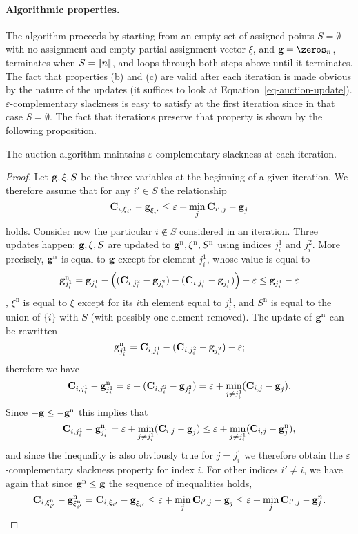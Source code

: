 \paragraph{Algorithmic properties.} The algorithm proceeds by starting from an empty set of assigned points $S=\emptyset$ with no assignment and empty partial assignment vector $\xi$, and $\gD=\zeros_n$, terminates when $S=\llbracket n\rrbracket$, and loops through both steps above until it terminates. The fact that properties {(b)} and {(c)} are valid after each iteration is made obvious by the nature of the updates (it suffices to look at Equation~\eqref{eq-auction-update}). $\varepsilon$-complementary slackness is easy to satisfy at the first iteration since in that case $S=\emptyset$. The fact that iterations preserve that property is shown by the following proposition.
\begin{prop} The auction algorithm maintains $\varepsilon$-complementary slackness at each iteration. 
\end{prop}
\begin{proof} 
	Let $\mathrm{\textbf{g}},\xi,S$ be the three variables at the beginning of a given iteration. We therefore assume that for any $i'\in S$ the relationship 
	$$\mathrm{\textbf{C}}_{i,\xi_{i'}} - \mathrm{\textbf{g}}_{\xi_{i'}}  \leq \varepsilon + \min_{j} \mathrm{\textbf{C}}_{{i'},j} - \mathrm{\textbf{g}}_{j} $$
holds. Consider now the particular $i\notin S$ considered in an iteration. Three updates happen: $\mathrm{\textbf{g}},\xi,S$ are updated to $\mathrm{\textbf{g}}^{\text{n}},\xi^{\text{n}},S^{\text{n}}$ using indices $j^1_i$ and $j^2_i$. More precisely, $\mathrm{\textbf{g}}^{\text{n}}$ is equal to $\mathrm{\textbf{g}}$ except for element $j^1_i$, whose value is equal to
$$\mathrm{\textbf{g}}_{j^1_{i}}^\text{n} = \mathrm{\textbf{g}}_{j^1_{i}} - \left((\mathrm{\textbf{C}}_{i,j^2_{i}}-\mathrm{\textbf{g}}_{j^2_{i}})-(\mathrm{\textbf{C}}_{i,j^1_{i}}-\mathrm{\textbf{g}}_{j^1_{i}})\right)-\varepsilon \leq \mathrm{\textbf{g}}_{j^1_{i}}-\varepsilon$$,
$\xi^{\text{n}}$ is equal to $\xi$ except for its $i$th element equal to $j^1_i$, and $S^{\text{n}}$ is equal to the union of $\{i\}$ with $S$ (with possibly one element removed). The update of $\mathrm{\textbf{g}}^{\text{n}}$ can be rewritten
$$\mathrm{\textbf{g}}^{\text{n}}_{j^1_i}= \mathrm{\textbf{C}}_{i,j^1_{i}} - (\mathrm{\textbf{C}}_{i,j^2_{i}}-\mathrm{\textbf{g}}_{j^2_{i}}) -\varepsilon;$$
therefore we have
$$\mathrm{\textbf{C}}_{i,j^1_{i}} - \mathrm{\textbf{g}}^{\text{n}}_{j^1_i}=  \varepsilon + (\mathrm{\textbf{C}}_{i,j^2_{i}}-\mathrm{\textbf{g}}_{j^2_{i}}) = \varepsilon+\min_{j\ne j^1_i} (\mathrm{\textbf{C}}_{i,j}-\mathrm{\textbf{g}}_{j}).$$
Since $-\mathrm{\textbf{g}}\leq -\mathrm{\textbf{g}}^{\text{n}}$ this implies that 
$$\mathrm{\textbf{C}}_{i,j^1_{i}} - \mathrm{\textbf{g}}^{\text{n}}_{j^1_i} = \varepsilon + \min_{j\ne j^1_i} (\mathrm{\textbf{C}}_{i,j}-\mathrm{\textbf{g}}_{j})\leq \varepsilon+\min_{j\ne j^1_i} (\mathrm{\textbf{C}}_{i,j}-\mathrm{\textbf{g}}^{\text{n}}_{j}),$$
and since the inequality is also obviously true for $j=j^1_i$ we therefore obtain the $\varepsilon$-complementary slackness property for index $i$. For other indices $i'\ne i$, we have again that since $\mathrm{\textbf{g}}^{\text{n}}\leq\mathrm{\textbf{g}}$ the sequence of inequalities holds,
$$\mathrm{\textbf{C}}_{i,\xi^{\text{n}}_{i'}} - \mathrm{\textbf{g}}^{\text{n}}_{\xi^{\text{n}}_{i'}} = \mathrm{\textbf{C}}_{i,\xi_{i'}} - \mathrm{\textbf{g}}_{\xi_{i'}} \leq \varepsilon + \min_{j} \mathrm{\textbf{C}}_{{i'},j} - \mathrm{\textbf{g}}_{j} \leq \varepsilon + \min_{j} \mathrm{\textbf{C}}_{{i'},j} - \mathrm{\textbf{g}}^{n}_{j}. $$
\end{proof}

